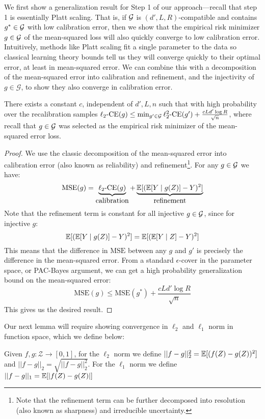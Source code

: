 We first show a generalization result for Step 1 of our approach---recall that step 1 is essentially Platt scaling.
That is, if $\mathcal{G}{}$ is $(d', L, R)$-compatible and contains $g^* \in \mathcal{G}{}$ with low calibration error, then we show that the empirical risk minimizer $g \in \mathcal{G}{}$ of the mean-squared loss will also quickly converge to low calibration error.
Intuitively, methods like Platt scaling fit a single parameter to the data so classical learning theory bounds tell us they will converge quickly to their optimal error, at least in mean-squared error.
We can combine this with a decomposition of the mean-squared error into calibration and refinement, and the injectivity of $g \in \mathcal{G}$, to show they also converge in calibration error.

\begin{lemma}
There exists a constant $c$, independent of $d', L, n$ such that with high probability over the recalibration samples $\ell_2\mbox{-CE}(g) \leq \min_{g' \in \mathcal{G}{}}\ell_2^2\mbox{-CE}(g') + \frac{cLd' \log{R}}{\sqrt{n}}$, where recall that $g \in \mathcal{G}{}$ was selected as the empirical risk minimizer of the mean-squared error loss.
\end{lemma}

\begin{proof}
We use the classic decomposition of the mean-squared error into calibration error (also known as reliability) and refinement\footnote{Note that the refinement term can be further decomposed into resolution (also known as sharpness) and irreducible uncertainty.}. For any $g \in \mathcal{G}{}$ we have:
\[ \mbox{MSE}(g) = \underbrace{\ell_2\mbox{-CE}(g)}_{\mbox{calibration}} + \underbrace{\mathbb{E}[(\mathbb{E}[Y \mid g(Z)] - Y)^2]}_{\mbox{refinement}} \]
Note that the refinement term is constant for all injective $g \in \mathcal{G}{}$, since for injective $g$:
\[ \mathbb{E}[(\mathbb{E}[Y \mid g(Z)] - Y)^2] = \mathbb{E}[(\mathbb{E}[Y \mid Z] - Y)^2] \]
This means that the difference in $\mbox{MSE}$ between any $g$ and $g'$ is precisely the difference in the mean-squared error. From a standard $\epsilon$-cover in the parameter space, or PAC-Bayes argument, we can get a high probability generalization bound on the mean-squared error:
\[ \mbox{MSE}(g) \leq \mbox{MSE}(g^*) + \frac{cLd' \log{R}}{\sqrt{n}} \]
This gives us the desired result.
\end{proof}

Our next lemma will require showing convergence in $\ell_2$ and $\ell_1$ norm in function space, which we define below:

\begin{definition}
Given $f, g : \mathcal{Z} \to [0, 1]$, for the $\ell_2$ norm we define $||f - g||_2^2 = \mathbb{E}[(f(Z) - g(Z))^2]$ and $||f- g||_2 = \sqrt{||f - g||_2^2}$. For the $\ell_1$ norm we define $||f - g||_1 = \mathbb{E}[\lvert f(Z) - g(Z)\rvert]$
\end{definition}

